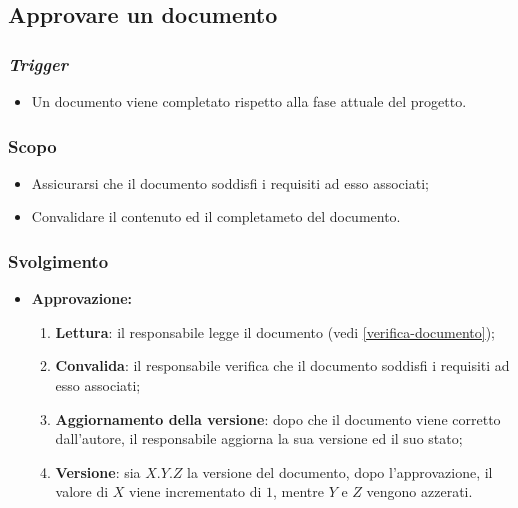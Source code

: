 \subsection{Approvare un documento}
\label{approvazione-documento}

\subsubsection{\textit{Trigger}}
\begin{itemize}
	\item Un documento viene completato rispetto alla fase attuale del progetto.
\end{itemize}

\subsubsection{Scopo}
\begin{itemize}
	\item Assicurarsi che il documento soddisfi i requisiti ad esso associati;

	\item Convalidare il contenuto ed il completameto del documento.
\end{itemize}

\subsubsection{Svolgimento}
\begin{itemize}
	\item \textbf{Approvazione:}
	      \begin{enumerate}
		      \item \textbf{Lettura}: il responsabile legge il
		            documento (vedi \cref{verifica-documento});

		      \item \textbf{Convalida}: il responsabile verifica che il
		            documento soddisfi i requisiti ad esso associati;

		      \item \textbf{Aggiornamento della versione}: dopo che il documento
		            viene corretto dall'autore, il responsabile aggiorna la
		            sua versione ed il suo stato;

		      \item \textbf{Versione}: sia $X.Y.Z$ la versione del documento,
		            dopo l'approvazione, il valore di $X$ viene incrementato di
		            $1$, mentre $Y$ e $Z$ vengono azzerati.
	      \end{enumerate}
\end{itemize}
